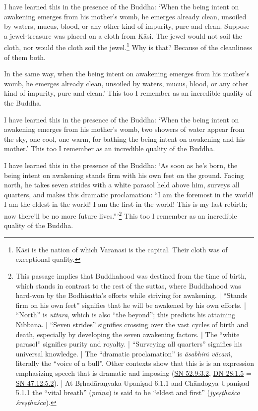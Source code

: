 \documentclass[12pt,openany]{book}%
\begin{document}
I have learned this in the presence of the Buddha: ‘When the being intent on awakening emerges from his mother’s womb, he emerges already clean, unsoiled by waters, mucus, blood, or any other kind of impurity, pure and clean. Suppose a jewel-treasure was placed on a cloth from \textsanskrit{Kāsi}. The jewel would not soil the cloth, nor would the cloth soil the jewel.\footnote{\textsanskrit{Kāsi} is the nation of which Varanasi is the capital. Their cloth was of exceptional quality. } Why is that? Because of the cleanliness of them both. 

In the same way, when the being intent on awakening emerges from his mother’s womb, he emerges already clean, unsoiled by waters, mucus, blood, or any other kind of impurity, pure and clean.’ This too I remember as an incredible quality of the Buddha. 

I have learned this in the presence of the Buddha: ‘When the being intent on awakening emerges from his mother’s womb, two showers of water appear from the sky, one cool, one warm, for bathing the being intent on awakening and his mother.’ This too I remember as an incredible quality of the Buddha. 

I have learned this in the presence of the Buddha: ‘As soon as he’s born, the being intent on awakening stands firm with his own feet on the ground. Facing north, he takes seven strides with a white parasol held above him, surveys all quarters, and makes this dramatic proclamation: “I am the foremost in the world! I am the eldest in the world! I am the first in the world! This is my last rebirth; now there’ll be no more future lives.”’\footnote{This passage implies that Buddhahood was destined from the time of birth, which stands in contrast to the rest of the suttas, where Buddhahood was hard-won by the Bodhisatta’s efforts while striving for awakening. | “Stands firm on his own feet” signifies that he will be awakened by his own efforts. | “North” is \textit{uttara}, which is also “the beyond”; this predicts his attaining Nibbana. | “Seven strides” signifies crossing over the vast cycles of birth and death, especially by developing the seven awakening factors. | The “white parasol” signifies purity and royalty. | “Surveying all quarters” signifies his universal knowledge. | The “dramatic proclamation” is \textit{\textsanskrit{āsabhiṁ} \textsanskrit{vācaṁ}}, literally the “voice of a bull”. Other contexts show that this is is an expression emphasizing speech that is dramatic and imposing (\href{https://suttacentral.net/sn52.9/en/sujato\#3.2}{SN 52.9:3.2}, \href{https://suttacentral.net/dn28/en/sujato\#1.5}{DN 28:1.5} = \href{https://suttacentral.net/sn47.12/en/sujato\#5.2}{SN 47.12:5.2}). | At \textsanskrit{Bṛhadāraṇyaka} \textsanskrit{Upaniṣad} 6.1.1 and \textsanskrit{Chāndogya} \textsanskrit{Upaniṣad} 5.1.1 the “vital breath” (\textit{\textsanskrit{prāṇa}}) is said to be “eldest and first” (\textit{\textsanskrit{jyeṣṭhaśca} \textsanskrit{śreṣṭhaśca}}). } This too I remember as an incredible quality of the Buddha. 
\end{document}
